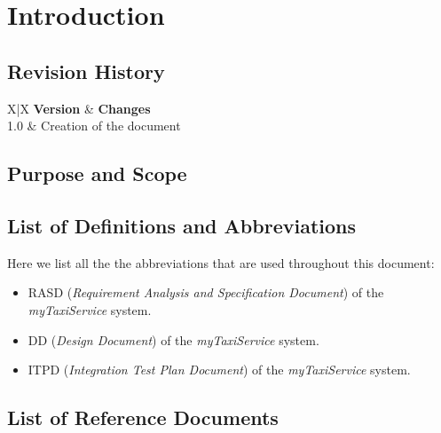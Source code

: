 \section{Introduction} %
\label{sec:introduction}

\subsection{Revision History} %
\label{sub:revision_history}
\begin{tabularx}{\textwidth}{ X|X }
	\textbf{Version} & \textbf{Changes} \\ \hline
	 {1.0} & Creation of the document \\
\end{tabularx}

\subsection{Purpose and Scope} %
\label{sub:purpose_and_scope}


\subsection{List of Definitions and Abbreviations} %
\label{sub:definitions_and_abbreviations}
Here we list all the the abbreviations that are used throughout this document:
\begin{itemize}
	\item RASD (\emph{Requirement Analysis and Specification Document}) of the \emph{myTaxiService} system.
	\item DD (\emph{Design Document}) of the \emph{myTaxiService} system.
	\item ITPD (\emph{Integration Test Plan Document}) of the \emph{myTaxiService} system.
\end{itemize}

\subsection{List of Reference Documents} %
\label{sub:reference_documents}
